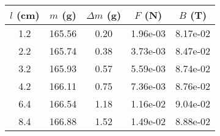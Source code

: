 \begin{tabular}{ccccc}
\toprule
$l$ (cm) & $m$ (g) & $\Delta m$ (g) & $F$ (N) & $B$ (T) \\
\midrule
1.2 & 165.56 & 0.20 & 1.96e-03 & 8.17e-02 \\
2.2 & 165.74 & 0.38 & 3.73e-03 & 8.47e-02 \\
3.2 & 165.93 & 0.57 & 5.59e-03 & 8.74e-02 \\
4.2 & 166.11 & 0.75 & 7.36e-03 & 8.76e-02 \\
6.4 & 166.54 & 1.18 & 1.16e-02 & 9.04e-02 \\
8.4 & 166.88 & 1.52 & 1.49e-02 & 8.88e-02 \\
\bottomrule
\end{tabular}
